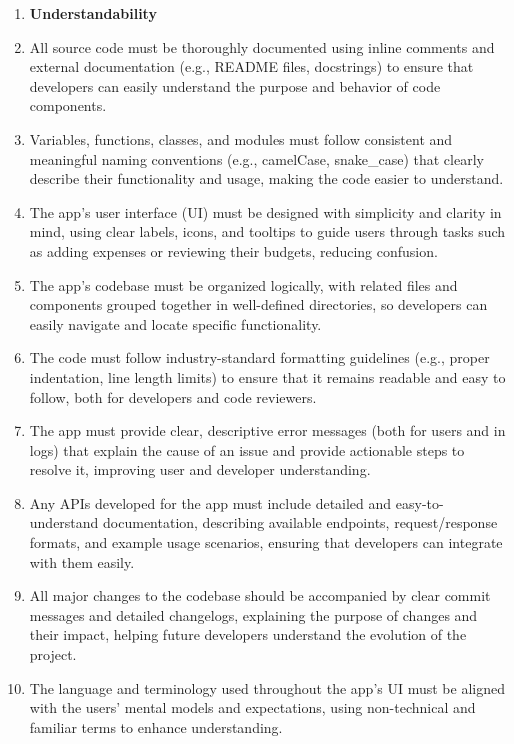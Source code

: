 \documentclass[12pt]{article}
\begin{document}
\begin{enumerate}[label=NFR\arabic*]
  \item[] \textbf{Understandability} 
  \item All source code must be thoroughly documented using inline comments and
  external documentation (e.g., README files, docstrings) to ensure that
  developers can easily understand the purpose and behavior of code components.
  \item Variables, functions, classes, and modules must follow consistent and
  meaningful naming conventions (e.g., camelCase, snake\_case) that clearly
  describe their functionality and usage, making the code easier to understand.
  \item The app's user interface (UI) must be designed with simplicity and
  clarity in mind, using clear labels, icons, and tooltips to guide users
  through tasks such as adding expenses or reviewing their budgets, reducing
  confusion.
  \item The app's codebase must be organized logically, with related files and
  components grouped together in well-defined directories, so developers can
  easily navigate and locate specific functionality.
  \item The code must follow industry-standard formatting guidelines (e.g.,
  proper indentation, line length limits) to ensure that it remains readable and
  easy to follow, both for developers and code reviewers.
  \item The app must provide clear, descriptive error messages (both for users
  and in logs) that explain the cause of an issue and provide actionable steps
  to resolve it, improving user and developer understanding.
  \item Any APIs developed for the app must include detailed and
  easy-to-understand documentation, describing available endpoints,
  request/response formats, and example usage scenarios, ensuring that
  developers can integrate with them easily.
  \item All major changes to the codebase should be accompanied by clear commit
  messages and detailed changelogs, explaining the purpose of changes and their
  impact, helping future developers understand the evolution of the project.
  \item The language and terminology used throughout the app's UI must be
  aligned with the users' mental models and expectations, using non-technical
  and familiar terms to enhance understanding.
\end{enumerate}


\newpage
\end{document}
